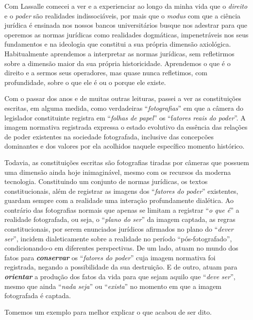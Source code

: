 Com Lassalle comecei a ver e a experienciar ao longo da minha vida que o
\emph{direito} e o \emph{poder} são realidades indissociáveis, por mais
que o \emph{modus} com que a ciência jurídica é ensinada nos nossos
bancos universitários busque nos adestrar para que operemos as normas
jurídicas como realidades dogmáticas, impenetráveis nos seus fundamentos
e na ideologia que constitui a sua própria dimensão axiológica.
Habitualmente aprendemos a interpretar as normas jurídicas, sem
refletirmos sobre a dimensão maior da sua própria historicidade.
Aprendemos o que é o direito e a sermos seus operadores, mas quase nunca
refletimos, com profundidade, sobre o que ele é ou o porque ele existe.

Com o passar dos anos e de muitas outras leituras, passei a ver as
constituições escritas, em alguma medida, como verdadeiras
``\emph{fotografias}'' em que a câmera do legislador constituinte
registra em ``\emph{folhas de papel}'' os ``f\emph{atores reais do
poder}''. A imagem normativa registrada expressa o estado evolutivo da
essência das relações de poder existentes na sociedade fotografada,
inclusive das concepcões dominantes e dos valores por ela acolhidos
naquele específico momento histórico.

Todavia, as constituições escritas são fotografias tiradas por câmeras
que possuem uma dimensão ainda hoje inimaginável, mesmo com os recursos
da moderna tecnologia. Constituindo um conjunto de normas jurídicas, os
textos constitucionais, além de registrar as imagens dos ``\emph{fatores
do poder}'' existentes, guardam sempre com a realidade uma interação
profundamente dialética. Ao contrário das fotografias normais que apenas
se limitam a registrar ``\emph{o que é}'' a realidade fotografada, ou
seja, o ``\emph{plano do ser}'' da imagem captada, as regras
constitucionais, por serem enunciados jurídicos afirmados no plano do
``\emph{dever ser}'', incidem dialeticamente sobre a realidade no
período ``pós-fotografado'', condicionando-o em diferentes perspectivas.
De um lado, atuam no mundo dos fatos para \textbf{\emph{conservar}} os
``\emph{fatores do poder}'' cuja imagem normativa foi registrada,
negando a possibilidade da sua destruição. E de outro, atuam para
\textbf{\emph{orientar}} a produção dos fatos da vida para que sejam
aquilo que ``\emph{deve ser}'', mesmo que ainda ``\emph{nada seja}'' ou
``\emph{exista}'' no momento em que a imagem fotografada é captada.

Tomemos um exemplo para melhor explicar o que acabou de ser dito.

